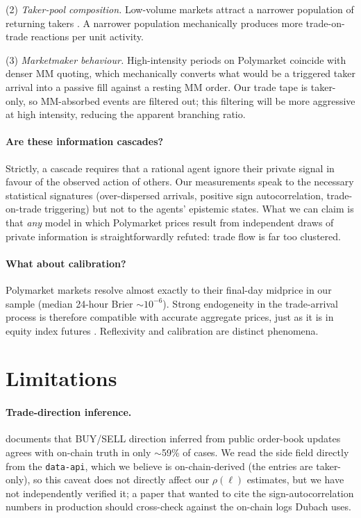 \documentclass{article}
\begin{document}
(2) \emph{Taker-pool composition.} Low-volume markets attract a
narrower population of returning takers
\citep[whose trading is highly concentrated;][]{tsang2026anatomy}. A
narrower population mechanically produces more
trade-on-trade reactions per unit activity.

(3) \emph{Marketmaker behaviour.} High-intensity periods on Polymarket
coincide with denser MM quoting, which mechanically converts what
would be a triggered taker arrival into a passive fill against a
resting MM order. Our trade tape is taker-only, so MM-absorbed events
are filtered out; this filtering will be more aggressive at high
intensity, reducing the apparent branching ratio.

\paragraph{Are these information cascades?}  Strictly, a
\citet{bikhchandani1992theory} cascade requires that a rational agent
ignore their private signal in favour of the observed action of others.
Our measurements speak to the necessary statistical signatures
(over-dispersed arrivals, positive sign autocorrelation,
trade-on-trade triggering) but not to the agents' epistemic states.
What we can claim is that \emph{any} model in which Polymarket prices
result from independent draws of private information is
straightforwardly refuted: trade flow is far too clustered.

\paragraph{What about calibration?} Polymarket markets resolve almost
exactly to their final-day midprice in our sample (median 24-hour
Brier $\sim 10^{-6}$). Strong endogeneity in the trade-arrival
process is therefore compatible with accurate aggregate prices,
just as it is in equity index futures
\citep{hardiman2013critical}. Reflexivity and calibration are
distinct phenomena.

\section{Limitations}\label{sec:limitations}

\paragraph{Trade-direction inference.} \citet{dubach2026anatomy}
documents that BUY/SELL direction inferred from public order-book
updates agrees with on-chain truth in only $\sim$59\% of cases. We
read the side field directly from the \texttt{data-api}, which we
believe is on-chain-derived (the entries are taker-only), so this
caveat does not directly affect our $\rho(\ell)$ estimates, but we
have not independently verified it; a paper that wanted to cite the
sign-autocorrelation numbers in production should cross-check against
the on-chain logs Dubach uses.
\end{document}
